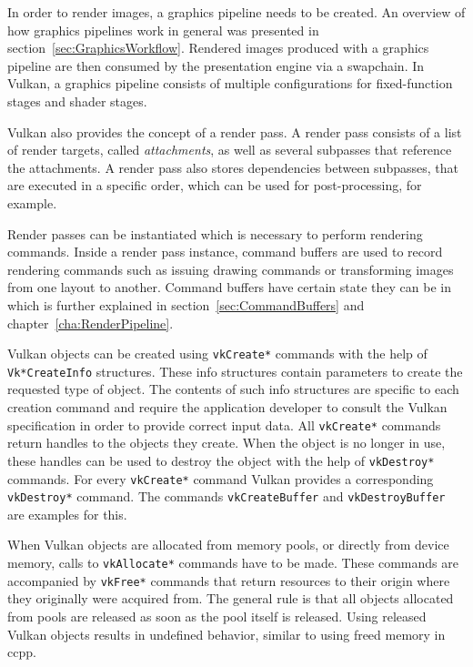     In order to render images, a graphics pipeline needs to be created.
    An overview of how graphics pipelines work in general was presented in section~\ref{sec:GraphicsWorkflow}.
    Rendered images produced with a graphics pipeline are then consumed by the presentation engine via a swapchain.
    In Vulkan, a graphics pipeline consists of multiple configurations for fixed-function stages and shader stages.

    Vulkan also provides the concept of a render pass.
    A render pass consists of a list of render targets, called \textit{attachments}, as well as several subpasses that reference the attachments.
    A render pass also stores dependencies between subpasses, that are executed in a specific order, which can be used for post-processing, for example.

    Render passes can be instantiated which is necessary to perform rendering commands.
    Inside a render pass instance, command buffers are used to record rendering commands such as issuing drawing commands or transforming images from one layout to another.
    Command buffers have certain state they can be in which is further explained in section~\ref{sec:CommandBuffers} and chapter~\ref{cha:RenderPipeline}.

    Vulkan objects can be created using \lstinline{vkCreate*} commands with the help of \lstinline{Vk*CreateInfo} structures.
    These info structures contain parameters to create the requested type of object.
    The contents of such info structures are specific to each creation command and require the application developer to consult the Vulkan specification in order to provide correct input data.
    All \lstinline{vkCreate*} commands return handles to the objects they create.
    When the object is no longer in use, these handles can be used to destroy the object with the help of \lstinline{vkDestroy*} commands.
    For every \lstinline{vkCreate*} command Vulkan provides a corresponding \lstinline{vkDestroy*} command.
    The commands \lstinline{vkCreateBuffer} and \lstinline{vkDestroyBuffer} are examples for this.

    When Vulkan objects are allocated from memory pools, or directly from device memory, calls to \lstinline{vkAllocate*} commands have to be made.
    These commands are accompanied by \lstinline{vkFree*} commands that return resources to their origin where they originally were acquired from.
    The general rule is that all objects allocated from pools are released as soon as the pool itself is released.
    Using released Vulkan objects results in undefined behavior, similar to using freed memory in \gls{ccpp}.

